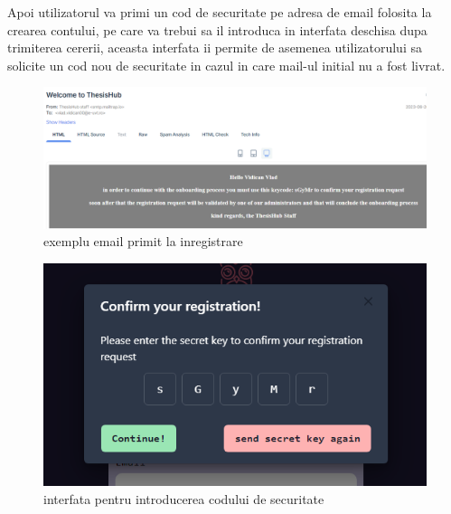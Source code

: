 \documentclass[12pt,a4paper,hidelinks]{report}
\theoremstyle{definition}
\theoremstyle{remark}
\begin{document}
Apoi utilizatorul va primi un cod de securitate pe adresa de email folosita la crearea contului, pe care va trebui sa il introduca
in interfata deschisa dupa trimiterea cererii, aceasta interfata ii permite de asemenea utilizatorului sa solicite un cod nou de securitate
in cazul in care mail-ul initial nu a fost livrat.
\begin{figure}[H]
    \centering
    \includegraphics[scale=0.5]{images/RegisterEmail.png}
    \caption{exemplu email primit la inregistrare}
\end{figure}
\begin{figure}[H]
    \centering
    \includegraphics[scale=0.5]{images/SecurityKey.png}
    \caption{interfata pentru introducerea codului de securitate}
\end{figure}
\end{document}
